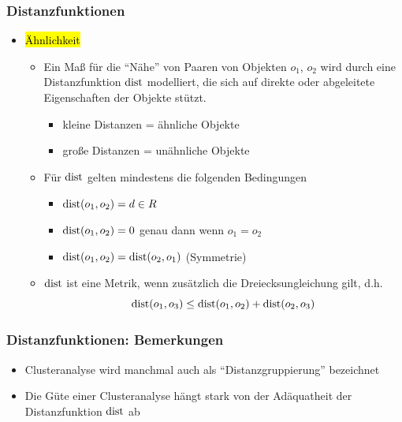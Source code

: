 \begin{frame}%
\frametitle{Distanzfunktionen}

\begin{itemize}
\item \hl{Ähnlichkeit}
\begin{itemize}
\item Ein Maß für die "`Nähe"' von Paaren von Objekten $o_1$, $o_2$
  wird durch eine Distanzfunktion $\operatorname{dist}$ modelliert, die sich auf
  direkte oder abgeleitete Eigenschaften  der Objekte stützt.
\begin{itemize}
\item kleine Distanzen = ähnliche Objekte
\item große Distanzen = unähnliche Objekte
\end{itemize}
\item Für $\operatorname{dist}$ gelten mindestens die folgenden Bedingungen
\begin{itemize}
\item $\operatorname{dist}(o_1, o_2) = d \in R$
\item $\operatorname{dist}(o_1, o_2) = 0$ genau dann wenn $o_1=o_2$
\item $\operatorname{dist}(o_1, o_2) = \operatorname{dist}(o_2,o_1)$ (Symmetrie)
\end{itemize}
\item $\operatorname{dist}$ ist eine Metrik, wenn zusätzlich die Dreiecksungleichung
  gilt, d.h.
$$\operatorname{dist}(o_1,o_3) \leq \operatorname{dist}(o_1,o_2) + \operatorname{dist}(o_2, o_3) $$
\end{itemize}
\end{itemize}

\end{frame}


\begin{frame}%
\frametitle{Distanzfunktionen: Bemerkungen}

\begin{itemize}
\item Clusteranalyse wird manchmal auch als "`Distanzgruppierung"'
  bezeichnet
\item Die Güte einer Clusteranalyse hängt stark von der Adäquatheit
  der Distanzfunktion $\operatorname{dist}$ ab
\end{itemize}

\end{frame}


